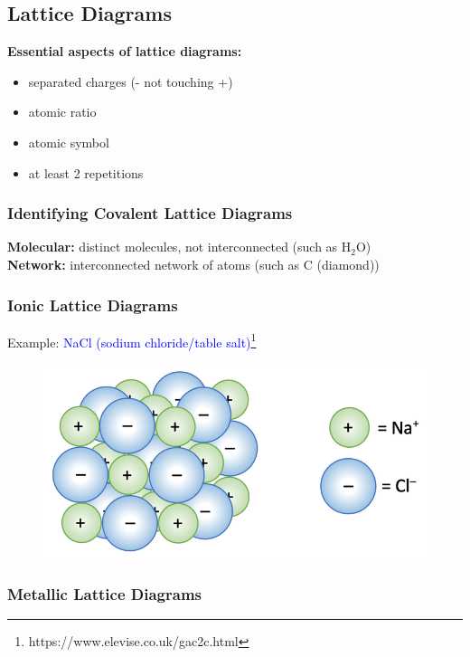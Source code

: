 \documentclass[a4paper, 12pt]{article}
\begin{document}
\subsection{Lattice Diagrams}

\textbf{Essential aspects of lattice diagrams:}
\begin{itemize}[leftmargin=*,nosep]
    \item separated charges (- not touching +)
    \item atomic ratio
    \item atomic symbol
    \item at least 2 repetitions
\end{itemize}

\subsubsection{Identifying Covalent Lattice Diagrams}
\textbf{Molecular:} distinct molecules, not interconnected (such as H$_2$O)
\\
\textbf{Network:} interconnected network of atoms (such as C (diamond))

\subsubsection{Ionic Lattice Diagrams}

Example: \textcolor{blue}{NaCl (sodium chloride/table salt)}\footnote{https://www.elevise.co.uk/gac2c.html}

\begin{figure}[ht]
    \centering
    \includegraphics[width=0.5\linewidth]{lattice.png} 
    \label{fig:1}
\end{figure} 

\subsubsection{Metallic Lattice Diagrams}
\end{document}
